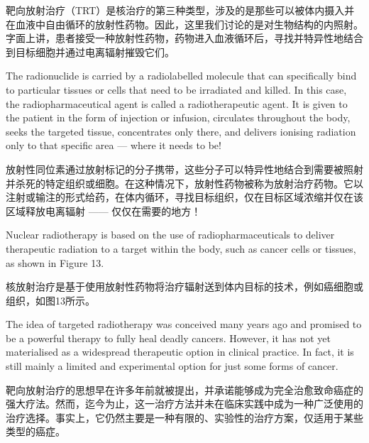 \documentclass[dvipsnames, svgnames,a4paper,11pt]{article}
\begin{document}
靶向放射治疗（TRT）是核治疗的第三种类型，涉及的是那些可以被体内摄入并在血液中自由循环的放射性药物。因此，这里我们讨论的是对生物结构的内照射。字面上讲，患者接受一种放射性药物，药物进入血液循环后，寻找并特异性地结合到目标细胞并通过电离辐射摧毁它们。  

The radionuclide is carried by a radiolabelled molecule that can specifically bind to particular tissues or cells that need to be irradiated and killed. In this case, the radiopharmaceutical agent is called a radiotherapeutic agent. It is given to the patient in the form of injection or infusion, circulates throughout the body, seeks the targeted tissue, concentrates only there, and delivers ionising radiation only to that specific area — where it needs to be!  

放射性同位素通过放射标记的分子携带，这些分子可以特异性地结合到需要被照射并杀死的特定组织或细胞。在这种情况下，放射性药物被称为放射治疗药物。它以注射或输注的形式给药，在体内循环，寻找目标组织，仅在目标区域浓缩并仅在该区域释放电离辐射 —— 仅仅在需要的地方！  

Nuclear radiotherapy is based on the use of radiopharmaceuticals to deliver therapeutic radiation to a target within the body, such as cancer cells or tissues, as shown in Figure 13.  

核放射治疗是基于使用放射性药物将治疗辐射送到体内目标的技术，例如癌细胞或组织，如图13所示。  

The idea of targeted radiotherapy was conceived many years ago and promised to be a powerful therapy to fully heal deadly cancers. However, it has not yet materialised as a widespread therapeutic option in clinical practice. In fact, it is still mainly a limited and experimental option for just some forms of cancer.


靶向放射治疗的思想早在许多年前就被提出，并承诺能够成为完全治愈致命癌症的强大疗法。然而，迄今为止，这一治疗方法并未在临床实践中成为一种广泛使用的治疗选择。事实上，它仍然主要是一种有限的、实验性的治疗方案，仅适用于某些类型的癌症。
\end{document}
